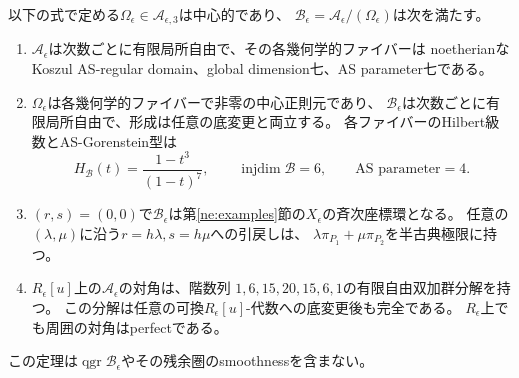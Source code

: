 \begin{theorem}[二つの非楕円成分の代数的量子化]
\label{nq:thm:family}
以下の式で定める$\Omega_\epsilon\in\mathcal A_{\epsilon,3}$は中心的であり、
$\mathcal B_\epsilon=\mathcal A_\epsilon/(\Omega_\epsilon)$は次を満たす。
\begin{enumerate}
\item $\mathcal A_\epsilon$は次数ごとに有限局所自由で、その各幾何学的ファイバーは
noetherianなKoszul AS-regular domain、global dimension七、AS parameter七である。
\item $\Omega_\epsilon$は各幾何学的ファイバーで非零の中心正則元であり、
$\mathcal B_\epsilon$は次数ごとに有限局所自由で、形成は任意の底変更と両立する。
各ファイバーのHilbert級数とAS-Gorenstein型は
\begin{equation}
 H_{\mathcal B}(t)=\frac{1-t^3}{(1-t)^7},\qquad
 \operatorname{injdim}\mathcal B=6,\qquad \text{AS parameter}=4.
\end{equation}
\item $(r,s)=(0,0)$で$\mathcal B_\epsilon$は第\ref{ne:examples}節の$X_\epsilon$の斉次座標環となる。
任意の$(\lambda,\mu)$に沿う$r=h\lambda,s=h\mu$への引戻しは、
$\lambda\pi_{P_1}+\mu\pi_{P_2}$を半古典極限に持つ。
\item $R_\epsilon[u]$上の$\mathcal A_\epsilon$の対角は、階数列
$1,6,15,20,15,6,1$の有限自由双加群分解を持つ。
この分解は任意の可換$R_\epsilon[u]$-代数への底変更後も完全である。
$R_\epsilon$上でも周囲の対角はperfectである。
\end{enumerate}
この定理は$\operatorname{qgr}\mathcal B_\epsilon$やその残余圏のsmoothnessを含まない。
\end{theorem}

